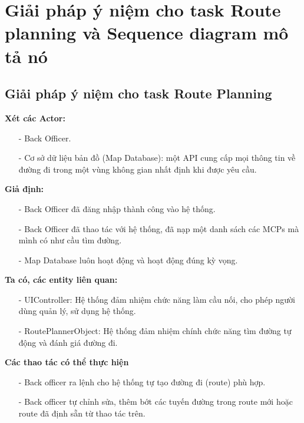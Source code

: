 
\section{Giải pháp ý niệm cho task Route planning và Sequence diagram mô tả nó}
    \subsection{Giải pháp ý niệm cho task Route Planning}
        \textbf{Xét các Actor: }

        \begin{itemize}
            \item[-] Back Officer.
            \item[-] Cơ sở dữ liệu bản đồ (Map Database): một API cung cấp mọi thông tin về đường đi trong một vùng không gian nhất định khi được yêu cầu.
        \end{itemize}

        \textbf{Giả định:}

        \begin{itemize}
            \item[-] Back Officer đã đăng nhập thành công vào hệ thống.
            \item[-] Back Officer đã thao tác với hệ thống, đã nạp một danh sách các MCPs mà mình có như cầu tìm đường.
            \item[-] Map Database luôn hoạt động và hoạt động đúng kỳ vọng.
        \end{itemize}

        \textbf{Ta có, các entity liên quan:}

        \begin{itemize}
            \item[-] UIController: Hệ thống đảm nhiệm chức năng làm cầu nối, cho phép người dùng quản lý, sử dụng hệ thống.
            \item[-] RoutePlannerObject: Hệ thống đảm nhiệm chính chức năng tìm đường tự động và đánh giá đường đi.
        \end{itemize}

        \textbf{Các thao tác có thể thực hiện}

        \begin{itemize}
            \item[-] Back officer ra lệnh cho hệ thống tự tạo đường đi (route) phù hợp.
            \item[-] Back officer tự chỉnh sửa, thêm bớt các tuyến đường trong route mới hoặc route đã định sẵn từ thao tác trên.
        \end{itemize}

